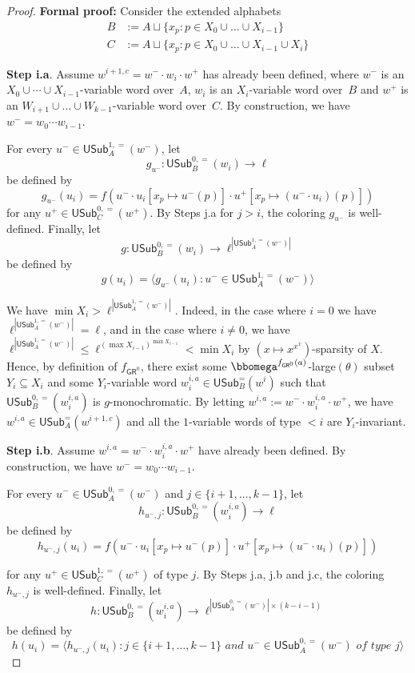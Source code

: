 \documentclass{article}
\numberwithin{theorem}{section}
\newcommand{\GR}{\mathsf{GR}}
\newcommand{\USub}{\mathsf{USub}}
\begin{document}
\begin{proof}
\noindent
\textbf{Formal proof:}
Consider the extended alphabets 
\begin{align*}
    B &:= A \sqcup \{x_p : p \in X_0 \cup \dots \cup X_{i-1}\}\\
    C &:= A \sqcup \{x_p : p \in X_0 \cup \dots \cup X_{i-1} \cup X_i\}
\end{align*}

\noindent
\textbf{Step i.a}. 
Assume $w^{i+1,c} = w^- \cdot w_i \cdot w^+$ has already been defined, where $w^-$ is an $X_0 \cup \cdots \cup X_{i-1}$-variable word over~$A$, $w_i$ is an $X_i$-variable word over~$B$ and $w^+$ is an $W_{i+1} \cup \dots \cup W_{k-1}$-variable word over~$C$. By construction, we have $w^- = w_0 \cdots w_{i-1}$.

\noindent
For every $u^- \in \USub_A^{1,=}(w^-)$, let $$g_{u^-} : \USub_B^{0,=}(w_i) \to \ell$$ be defined by
$$g_{u^-}(u_i) = f(u^- \cdot u_i[x_p \mapsto u^-(p)] \cdot u^+[x_p \mapsto (u^- \cdot u_i)(p)])$$
for any $u^+ \in \USub_{C}^{0,=}(w^+)$. By Steps j.a for $j > i$, the coloring $g_{u^-}$ is well-defined.
Finally, let $$g : \USub_B^{0,=}(w_i) \to \ell^{|\USub_A^{1,=}(w^-)|}$$ be defined by $$g(u_i) = \langle g_{u^-}(u_i) : u^- \in \USub_A^{1,=}(w^-)\rangle$$

We have $\min X_i > \ell^{|\USub_A^{1,=}(w^-)|}$. Indeed, in the case where $i = 0$ we have $\ell^{|\USub_A^{1,=}(w^-)|} = \ell$, and in the case where $i \neq 0$, we have $\ell^{|\USub_A^{1,=}(w^-)|} \leq \ell^{(\max X_{i-1})^{\max X_{i-1}}} < \min X_i$ by $(x \mapsto x^{x^x})$-sparsity of $X$. Hence, by definition of $f_{\GR^0}$, there exist some  $\bbomega^{f_{\GR^0}(a)}$-large$(\theta)$ subset $Y_i \subseteq X_i$ and some $Y_i$-variable word $w_i^{i,a} \in \USub_B^=(w^i)$ such that $\USub_B^{0,=}(w^{i,a}_i)$ is $g$-monochromatic. By letting $w^{i,a} := w^- \cdot w_i^{i,a} \cdot w^+$, we have $w^{i,a} \in \USub_A^=(w^{i+1,c})$ and all the $1$-variable words of type $<i$ are $Y_i$-invariant.
\smallskip

\noindent
\textbf{Step i.b}. Assume $w^{i,a} = w^- \cdot w^{i,a}_i \cdot w^+$ have already been defined. By construction, we have $w^- = w_0 \cdots w_{i-1}$.

\noindent
For every $u^- \in \USub_A^{0,=}(w^-)$ and $j \in \{i+1, \dots, k-1\}$, let $$h_{u^-,j} : \USub_{B}^{0,=}(w_i^{i,a}) \to \ell$$
be defined by $$h_{u^-,j}(u_i) = f(u^- \cdot u_i[x_p \mapsto u^-(p)] \cdot u^+[x_p \mapsto (u^- \cdot u_i)(p)])$$

for any $u^+ \in \USub_{C}^{1,=}(w^+)$ of type $j$. By Steps
j.a, j.b and j.c, the coloring $h_{u^-,j}$ is well-defined.
Finally, let $$h :  \USub_{B}^{0,=}(w_i^{i,a}) \to \ell^{|\USub_A^{0,=}(w^-)| \times (k-i-1)}$$
be defined by $$h(u_i) = \langle h_{u^-,j}(u_i) : j \in \{i+1, \dots, k-1\} \textit{ and } u^- \in \USub_A^{0,=}(w^-) \textit{ of type $j$} \rangle$$


\end{proof}
\end{document}
